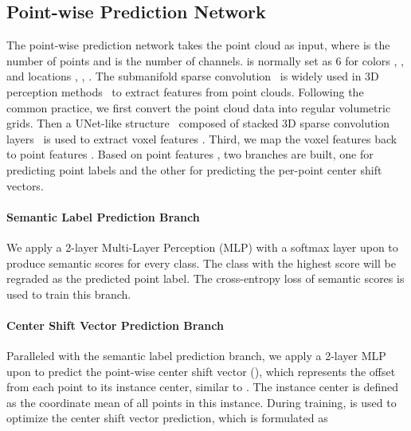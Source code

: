 \documentclass[10pt,twocolumn,letterpaper]{article}
\begin{document}
\subsection{Point-wise Prediction Network}
\label{sec:point-wise}
The point-wise prediction network takes the point cloud  as input, where  is the number of points and  is the number of channels.  is normally set as 6 for colors , ,  and locations , , .
The submanifold sparse convolution~\cite{Submanifold} is widely used in 3D perception methods~\cite{PointGroup,MTML,MASC,3D-MPA} to extract features from point clouds. Following the common practice, we first convert the point cloud data into regular volumetric grids. Then a UNet-like structure~\cite{UNet} composed of stacked 3D sparse convolution layers~\cite{Submanifold} is used to extract voxel features . Third, we map the voxel features  back to point features  .
Based on point features , two branches are built, one for predicting point labels and the other for predicting the per-point center shift vectors.

\paragraph{Semantic Label Prediction Branch}
We apply a 2-layer Multi-Layer Perception (MLP) with a softmax layer upon  to produce semantic scores for every class. The class with the highest score will be regraded as the predicted point label. The cross-entropy loss of semantic scores  is used to train this branch.


\paragraph{Center Shift Vector Prediction Branch}
Paralleled with the semantic label prediction branch, we apply a 2-layer MLP upon   to predict the point-wise center shift vector  (), which represents the offset from each point to its instance center, similar to \cite{3D-MPA,PointGroup}. The instance center is defined as the coordinate mean of all points in this instance.
During training,  is used to optimize the center shift vector prediction, which is formulated as
\end{document}
